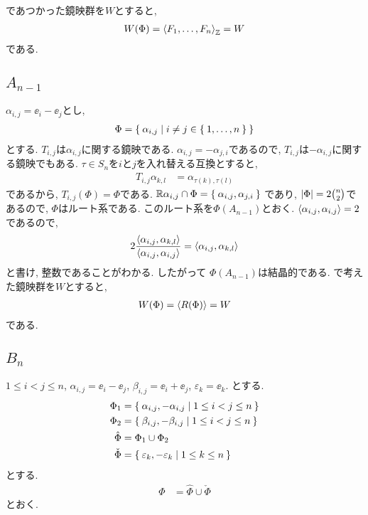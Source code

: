 であつかった鏡映群を$W$とすると,
\begin{align*}
  W(\Phi)=\Braket{F_1,\ldots,F_n}_{\mathbb{Z}}=W
\end{align*}
である.

\subsection{$A_{n-1}$}
\label{ex:an:root}
$\alpha_{i,j}=\ee_i-\ee_j$とし,
\begin{align*}
  \Phi=\Set{\alpha_{i,j}|i\neq j \in \Set{1,\ldots,n}}
\end{align*}
とする.
$T_{i,j}$は$\alpha_{i,j}$に関する鏡映である.
$\alpha_{i,j}=-\alpha_{j,i}$であるので,
$T_{i,j}$は$-\alpha_{i,j}$に関する鏡映でもある.
$\tau\in S_n$を$i$と$j$を入れ替える互換とすると,
\begin{align*}
  T_{i,j}\alpha_{k,l}&=\alpha_{\tau(k),\tau(l)}
\end{align*}
であるから, $T_{i,j}(\Phi)=\Phi$である.
$\mathbb{R}\alpha_{i,j}\cap \Phi=\Set{\alpha_{i,j},\alpha_{j,i}}$
であり,
$\left|\Phi\right|=2\binom{n}{2}$であるので,
$\Phi$はルート系である.
このルート系を$\Phi(A_{n-1})$とおく.
$\Braket{\alpha_{i,j},\alpha_{i,j}}=2$であるので,
\begin{align*}
  2\frac{\Braket{\alpha_{i,j},\alpha_{k,l}}}{\Braket{\alpha_{i,j},\alpha_{i,j}}}=\Braket{\alpha_{i,j},\alpha_{k,l}}
\end{align*}
と書け, 整数であることがわかる.
したがって
$\Phi(A_{n-1})$は結晶的である.
で考えた鏡映群を$W$とすると,
\begin{align*}
  W(\Phi)=\Braket{R(\Phi)}=W
\end{align*}
である.

\subsection{$B_{n}$}
\label{ex:bn:root}
$1\leq i<j\leq n$,
$\alpha_{i,j}=\ee_i-\ee_j$,
$\beta_{i,j}=\ee_i+\ee_j$,
$\varepsilon_{k}=\ee_k$.
とする.
\begin{align*}
  \Phi_1&=\Set{\alpha_{i,j},-\alpha_{i,j}|1\leq i<j\leq n}\\
  \Phi_2&=\Set{\beta_{i,j},-\beta_{i,j}|1\leq i<j\leq n}\\
  \hat\Phi&=\Phi_1\cup \Phi_2\\
  \check\Phi&=\Set{\varepsilon_k,-\varepsilon_k|1\leq k\leq n}
\end{align*}
とする.
\begin{align*}
  \Phi&=\hat\Phi\cup \check\Phi
\end{align*}
とおく.


